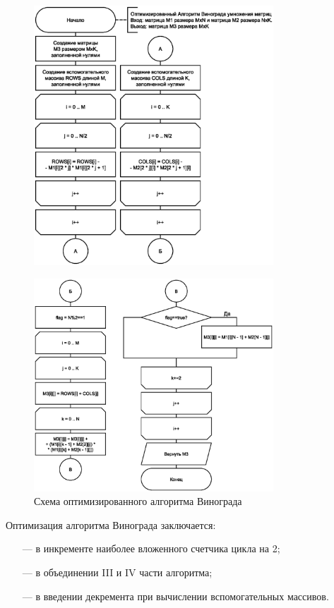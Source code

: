 \begin{figure}[h]
    \centering
    \includegraphics[width=0.8\textwidth]{images/schemes/opt_vinograd_mult_pt1.eps}
    \label{fig:scheme-4}
\end{figure}
\begin{figure}[h]
    \centering
    \includegraphics[width=0.8\textwidth]{images/schemes/opt_vinograd_mult_pt2.eps}
    \caption{Схема оптимизированного алгоритма Винограда}
    \label{fig:scheme-5}
\end{figure}

\clearpage

Оптимизация алгоритма Винограда заключается:
\begin{itemize}
	\item[---] в инкременте наиболее вложенного счетчика цикла на 2;
	\item[---] в объединении III и IV части алгоритма;
	\item[---] в введении декремента при вычислении вспомогательных массивов.
\end{itemize}

